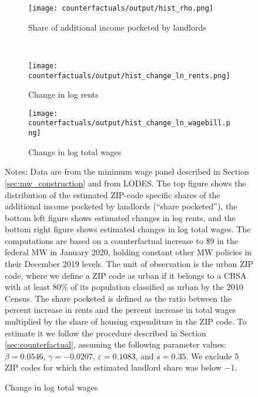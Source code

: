 \begin{figure}[h!]
    \centering
    \caption{Distributions of estimated shares pocketed by landlords under a 
            counterfactual federal MW policy of \$9, urban ZIP codes}
    \label{fig:cf_hist_rents_wages_shares}

    \begin{subfigure}{0.65\textwidth}
        \caption*{Share of additional income pocketed by landlords}
        \texttt{[image: counterfactuals/output/hist\_rho.png]}
    \end{subfigure}\\
    \begin{subfigure}{0.5\textwidth}
        \caption*{Change in log rents}
        \texttt{[image: counterfactuals/output/hist\_change\_ln\_rents.png]}
    \end{subfigure}%
    \begin{subfigure}{0.5\textwidth}
        \caption*{Change in log total wages}
        \texttt{[image: counterfactuals/output/hist\_change\_ln\_wagebill.png]}
    \end{subfigure}

    \begin{minipage}{.95\textwidth} \footnotesize
        \vspace{3mm}
        Notes:
        Data are from the minimum wage panel described in 
        Section \ref{sec:mw_construction} and from LODES.
        The top figure shows the distribution of the estimated ZIP-code specific
        shares of the additional income pocketed by landlords (``share pocketed''), 
        the bottom left figure shows estimated changes in log rents, and 
        the bottom right figure shows estimated changes in log total wages.
        The computations are based on a counterfactual increase to \$9 in the 
        federal MW in January 2020, holding constant other MW policies in their 
        December 2019 levels.
        The unit of observation is the urban ZIP code, where we define a ZIP code 
        as urban if it belongs to a CBSA with at least 80\% of its population 
        classified as urban by the 2010 Census.
        The share pocketed is defined as the ratio between the percent increase 
        in rents and the percent increase in total wages multiplied by the share 
        of housing expenditure in the ZIP code.
        To estimate it we follow the procedure described in Section 
        \ref{sec:counterfactual}, assuming the following parameter values: 
        $\beta = 0.0546$, $\gamma = -0.0207$, $\varepsilon = 0.1083$, and 
        $s = 0.35$.
        We exclude 5 ZIP codes for which the estimated landlord share was 
        below $-1$.
    \end{minipage}
\end{figure}
